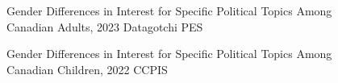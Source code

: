\documentclass[
  letterpaper,
  DIV=11,
  numbers=noendperiod]{scrreprt}
\begin{document}
\begin{figure}


\caption{\label{fig-interestdg}Gender Differences in Interest for
Specific Political Topics Among Canadian Adults, 2023 Datagotchi PES}

\end{figure}%

\begin{figure}


\caption{\label{fig-interestccpis}Gender Differences in Interest for
Specific Political Topics Among Canadian Children, 2022 CCPIS}

\end{figure}%
\end{document}

